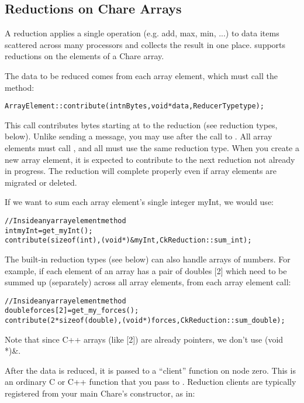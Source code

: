 \subsection{Reductions on Chare Arrays}
A reduction applies a single operation (e.g. add,
max, min, ...) to data items scattered across many processors and
collects the result in one place.  \charmpp{} supports reductions on the
elements of a Chare array.

The data to be reduced comes from each array element, 
which must call the  method:

\begin{alltt}
ArrayElement::contribute(int nBytes,void *data,ReducerType type);
\end{alltt}

This call contributes  bytes starting at  to the
reduction  (see reduction types, below).  Unlike sending a
message, you may use  after the call to .  All
array elements must call , and all must use the same
reduction type.  When you create a new array element, it is expected
to contribute to the next reduction not already in progress.  The
reduction will complete properly even if array elements are migrated
or deleted.

If we want to sum each array element's single integer myInt, we would use:

\begin{alltt}
    //Inside any array element method
    int myInt=get_myInt();
    contribute(sizeof(int),(void *)\&myInt,CkReduction::sum_int);
\end{alltt}

The built-in reduction types (see below) can also handle arrays of
numbers.  For example, if each element of an array has a pair of
doubles [2] which need to be summed up (separately) across
all array elements, from each array element call:

\begin{alltt}
    //Inside any array element method
    double forces[2]=get_my_forces();
    contribute(2*sizeof(double),(void *)forces,CkReduction::sum_double);
\end{alltt}

Note that since C++ arrays (like [2]) are already pointers, we 
don't use (void *)\&.


After the data is reduced, it is passed to a ``client'' function on
node zero.  This is an ordinary C or C++ function that you pass to
.  Reduction clients are
typically registered from your main Chare's constructor, as in:

